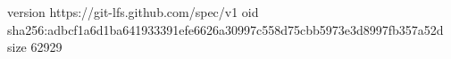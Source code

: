 version https://git-lfs.github.com/spec/v1
oid sha256:adbcf1a6d1ba641933391efe6626a30997c558d75cbb5973e3d8997fb357a52d
size 62929
